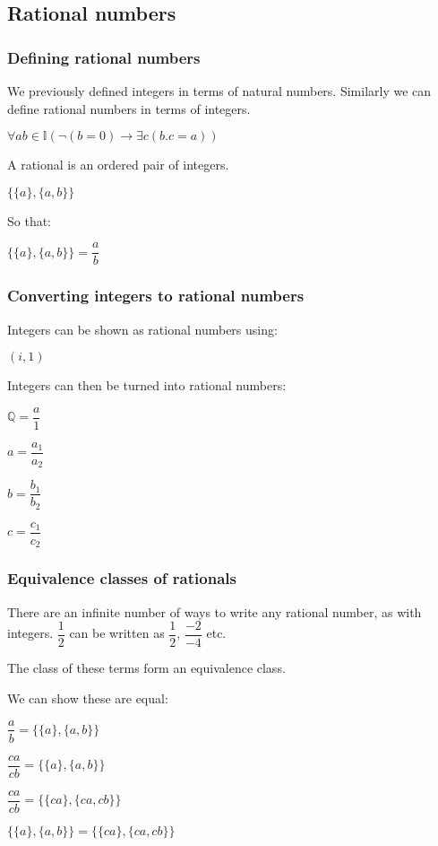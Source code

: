 \subsection{Rational numbers}


\subsubsection{Defining rational numbers}

We previously defined integers in terms of natural numbers. Similarly we can define rational numbers in terms of integers.

\(\forall ab \in \mathbb{I} (\neg (b=0)\rightarrow \exists c (b.c=a))\)

A rational is an ordered pair of integers.

\(\{\{a\},\{a,b\}\}\)

So that:

\(\{\{a\},\{a,b\}\}=\dfrac{a}{b}\)

\subsubsection{Converting integers to rational numbers}

Integers can be shown as rational numbers using:

\((i,1)\)

Integers can then be turned into rational numbers:

\(\mathbb{Q}=\dfrac{a}{1}\)

\(a=\dfrac{a_1}{a_2}\)

\(b=\dfrac{b_1}{b_2}\)

\(c=\dfrac{c_1}{c_2}\)

\subsubsection{Equivalence classes of rationals}

There are an infinite number of ways to write any rational number, as with integers. \(\dfrac{1}{2}\) can be written as \(\dfrac{1}{2}\), \(\dfrac{-2}{-4}\) etc.

The class of these terms form an equivalence class.

We can show these are equal:

\(\dfrac{a}{b}=\{\{a\},\{a,b\}\}\)

\(\dfrac{ca}{cb}=\{\{a\},\{a,b\}\}\)

\(\dfrac{ca}{cb}=\{\{ca\},\{ca,cb\}\}\)

\(\{\{a\},\{a,b\}\}=\{\{ca\},\{ca,cb\}\}\)

